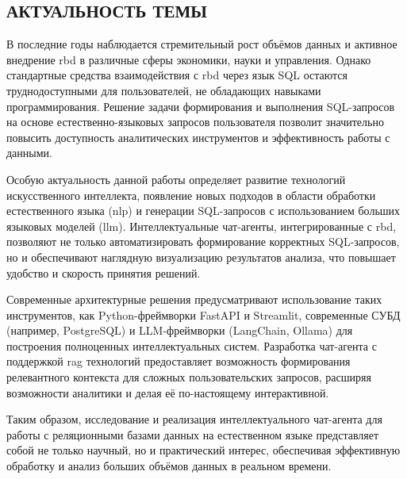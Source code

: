 \subsection{АКТУАЛЬНОСТЬ ТЕМЫ}

В последние годы наблюдается стремительный рост объёмов данных и активное внедрение \gls{rbd} в различные сферы экономики, науки и управления. Однако стандартные средства взаимодействия с \gls{rbd} через язык SQL остаются труднодоступными для пользователей, не обладающих навыками программирования. Решение задачи формирования и выполнения SQL-запросов на основе естественно-языковых запросов пользователя позволит значительно повысить доступность аналитических инструментов и эффективность работы с данными.

Особую актуальность данной работы определяет развитие технологий искусственного интеллекта, появление новых подходов в области обработки естественного языка (\gls{nlp}) и генерации SQL-запросов с использованием больших языковых моделей (\gls{llm}). Интеллектуальные чат-агенты, интегрированные с \gls{rbd}, позволяют не только автоматизировать формирование корректных SQL-запросов, но и обеспечивают наглядную визуализацию результатов анализа, что повышает удобство и скорость принятия решений.

Современные архитектурные решения предусматривают использование таких инструментов, как Python-фреймворки FastAPI и Streamlit, современные СУБД (например, PostgreSQL) и LLM-фреймворки (LangChain, Ollama) для построения полноценных интеллектуальных систем. Разработка чат-агента с поддержкой \gls{rag} технологий предоставляет возможность формирования релевантного контекста для сложных пользовательских запросов, расширяя возможности аналитики и делая её по-настоящему интерактивной.

Таким образом, исследование и реализация интеллектуального чат-агента для работы с реляционными базами данных на естественном языке представляет собой не только научный, но и практический интерес, обеспечивая эффективную обработку и анализ больших объёмов данных в реальном времени.